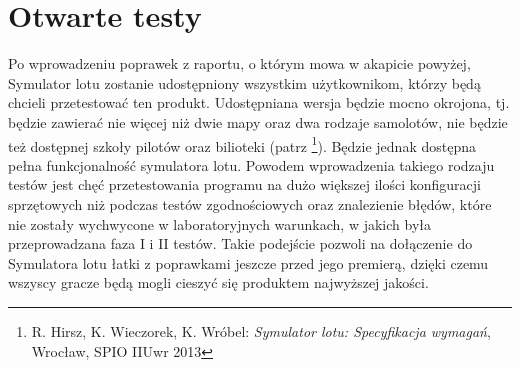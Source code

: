 \documentclass{mwrep}
\begin{document}
\section{Otwarte testy}
Po wprowadzeniu poprawek z raportu, o którym mowa w akapicie powyżej, Symulator lotu zostanie udostępniony wszystkim użytkownikom, którzy będą chcieli przetestować ten produkt. Udostępniana wersja będzie mocno okrojona, tj. będzie zawierać nie więcej niż dwie mapy oraz dwa rodzaje samolotów, nie będzie też dostępnej szkoły pilotów oraz bilioteki (patrz \footnote{R. Hirsz, K. Wieczorek, K. Wróbel: \textit{Symulator lotu: Specyfikacja wymagań}, Wrocław, SPIO IIUwr 2013}). Będzie jednak dostępna pełna funkcjonalność symulatora lotu. Powodem wprowadzenia takiego rodzaju testów jest chęć przetestowania programu na dużo większej ilości konfiguracji sprzętowych niż podczas testów zgodnościowych oraz znalezienie błędów, które nie zostały wychwycone w laboratoryjnych warunkach, w jakich była przeprowadzana faza I i II testów. Takie podejście pozwoli na dołączenie do Symulatora lotu łatki z poprawkami jeszcze przed jego premierą, dzięki czemu wszyscy gracze będą mogli cieszyć się produktem najwyższej jakości.
\end{document}
